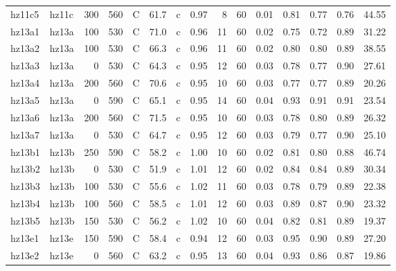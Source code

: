 \documentclass{article}
\begin{document}
\begin{landscape}
\begin{longtable}{llrrlrlrrrrrrrr}
      hz11c5 &      hz11c &  300 &  560 &     C &    61.7 &   c &  0.97 &   8 &         60 &  0.01 &  0.81 &  0.77 &  0.76 &   44.55 \\
      hz13a1 &      hz13a &  100 &  530 &     C &    71.0 &   c &  0.96 &  11 &         60 &  0.02 &  0.75 &  0.72 &  0.89 &   31.22 \\
      hz13a2 &      hz13a &  100 &  530 &     C &    66.3 &   c &  0.96 &  11 &         60 &  0.02 &  0.80 &  0.80 &  0.89 &   38.55 \\
      hz13a3 &      hz13a &    0 &  530 &     C &    64.3 &   c &  0.95 &  12 &         60 &  0.03 &  0.78 &  0.77 &  0.90 &   27.61 \\
      hz13a4 &      hz13a &  200 &  560 &     C &    70.6 &   c &  0.95 &  10 &         60 &  0.03 &  0.77 &  0.77 &  0.89 &   20.26 \\
      hz13a5 &      hz13a &    0 &  590 &     C &    65.1 &   c &  0.95 &  14 &         60 &  0.04 &  0.93 &  0.91 &  0.91 &   23.54 \\
      hz13a6 &      hz13a &  200 &  560 &     C &    71.5 &   c &  0.95 &  10 &         60 &  0.03 &  0.78 &  0.80 &  0.89 &   26.32 \\
      hz13a7 &      hz13a &    0 &  530 &     C &    64.7 &   c &  0.95 &  12 &         60 &  0.03 &  0.79 &  0.77 &  0.90 &   25.10 \\
      hz13b1 &      hz13b &  250 &  590 &     C &    58.2 &   c &  1.00 &  10 &         60 &  0.02 &  0.81 &  0.80 &  0.88 &   46.74 \\
      hz13b2 &      hz13b &    0 &  530 &     C &    51.9 &   c &  1.01 &  12 &         60 &  0.02 &  0.84 &  0.84 &  0.89 &   30.34 \\
      hz13b3 &      hz13b &  100 &  530 &     C &    55.6 &   c &  1.02 &  11 &         60 &  0.03 &  0.78 &  0.79 &  0.89 &   22.38 \\
      hz13b4 &      hz13b &  100 &  560 &     C &    58.5 &   c &  1.01 &  12 &         60 &  0.03 &  0.89 &  0.87 &  0.90 &   23.32 \\
      hz13b5 &      hz13b &  150 &  530 &     C &    56.2 &   c &  1.02 &  10 &         60 &  0.04 &  0.82 &  0.81 &  0.89 &   19.37 \\
      hz13e1 &      hz13e &  150 &  590 &     C &    58.4 &   c &  0.94 &  12 &         60 &  0.03 &  0.95 &  0.90 &  0.89 &   27.20 \\
      hz13e2 &      hz13e &    0 &  560 &     C &    63.2 &   c &  0.95 &  13 &         60 &  0.04 &  0.93 &  0.86 &  0.87 &   19.86 \\

\end{longtable}
\end{landscape}
\end{document}
